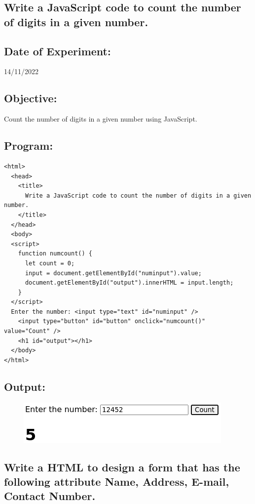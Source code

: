 \documentclass[12pt, a4paper]{article}
\begin{document}
\begin{tcolorbox}
  \section{Write a JavaScript code to count the number of digits in a given number.}
\end{tcolorbox}
\subsection*{Date of Experiment:}
14/11/2022
\subsection*{Objective:}
Count the number of digits in a given number using JavaScript.

\subsection*{Program:}
\begin{lstlisting}
<html>
  <head>
    <title>
      Write a JavaScript code to count the number of digits in a given number.
    </title>
  </head>
  <body>
  <script>
    function numcount() {
      let count = 0;
      input = document.getElementById("numinput").value;
      document.getElementById("output").innerHTML = input.length;
    }
  </script>
  Enter the number: <input type="text" id="numinput" />
    <input type="button" id="button" onclick="numcount()" value="Count" />
    <h1 id="output"></h1>
  </body>
</html>
\end{lstlisting}
\subsection*{Output:}
\begin{figure}[h]
  \centering
  \includegraphics{9}
\end{figure}

\pagebreak

\begin{tcolorbox}
  \section{Write a HTML to design a form that has the following attribute Name, Address, E-mail, Contact Number.}
\end{tcolorbox}
\end{document}
